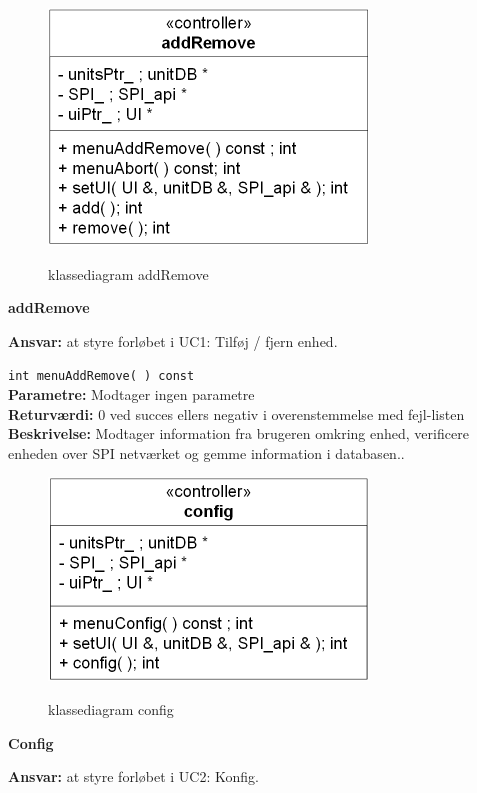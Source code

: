 \newpage

\begin{figure}[htbp] \centering
{\includegraphics[scale=1.5]{filer/design/Klassediagrammer/sw_addRemove}}
\caption{klassediagram addRemove}
\label{fig:addRemove klassediagram}
\end{figure} 

{\centering
\textbf{addRemove}\par
}
\textbf{Ansvar:} at styre forløbet i UC1: Tilføj / fjern enhed. \

\verb+int menuAddRemove( ) const+ \\
\textbf{Parametre:} Modtager ingen parametre \\
\textbf{Returværdi:} 0 ved succes ellers negativ i overenstemmelse med fejl-listen \\
\textbf{Beskrivelse:} Modtager information fra brugeren omkring enhed, verificere enheden over SPI netværket og gemme information i databasen..\\

\begin{figure}[htbp] \centering
{\includegraphics[scale=1.5]{filer/design/Klassediagrammer/sw_config}}
\caption{klassediagram config}
\label{fig:config klassediagram}
\end{figure} 

{\centering
\textbf{Config}\par
}
\textbf{Ansvar:} at styre forløbet i UC2: Konfig. \


